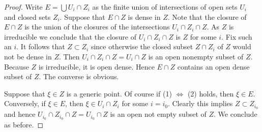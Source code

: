 \documentclass{ujarticle}
\begin{document}
\begin{proof}
Write $E = \bigcup U_i \cap Z_i$ as the finite union of
intersections of open sets $U_i$ and closed sets $Z_i$.
Suppose that $E \cap Z$ is dense in $Z$. Note that
the closure of $E \cap Z$ is the union of the closures
of the intersections $U_i \cap Z_i \cap Z$. As $Z$ is irreducible we
conclude that the closure of $U_i \cap Z_i \cap Z$ is $Z$ for some $i$.
Fix such an $i$. It follows that $Z \subset Z_i$ since otherwise
the closed subset $Z \cap Z_i$ of $Z$ would not be dense in $Z$.
Then $U_i \cap Z_i \cap Z = U_i \cap Z$ is an open nonempty subset of $Z$.
Because $Z$ is irreducible, it is open dense. Hence $E \cap Z$
contains an open dense subset of $Z$.
The converse is obvious.

\medskip\noindent
Suppose that $\xi \in Z$ is a generic point. Of course if
(1) $\Leftrightarrow$ (2) holds, then $\xi \in E$. Conversely,
if $\xi \in E$, then $\xi \in U_i \cap Z_i$ for some $i = i_0$.
Clearly this implies $Z \subset Z_{i_0}$ and hence
$U_{i_0} \cap Z_{i_0} \cap Z = U_{i_0} \cap Z$ is an open
not empty subset of $Z$. We conclude as before.
\end{proof}
\end{document}
